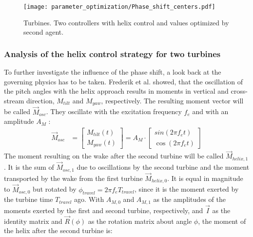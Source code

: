 \begin{figure}
	\centering
	\texttt{[image: parameter\_optimization/Phase\_shift\_centers.pdf]}
	\caption{ Turbines. Two controllers with helix control and values optimized by second agent.}
	\label{fig:phase_shift}
\end{figure}
\subsubsection{Analysis of the helix control strategy for two turbines}
To further investigate the influence of the phase shift, a look back at the governing physics has to be taken. Frederik et al. \cite{frederik_helix_2020} showed, that the oscillation of the pitch angles with the helix approach results in moments in vertical and cross-stream direction, $M_{tilt}$ and $M_{yaw}$, respectively. The resulting moment vector will be called $\vec{M}_{osc}$. They oscillate with the excitation frequency $f_e$ and with an amplitude $A_M$ :
\begin{align}
\vec{M}_{osc} &=
\begin{bmatrix}
M_{tilt}(t) \\
M_{yaw}(t)
\end{bmatrix} = 
A_M \cdot
\begin{bmatrix}
sin(2\pi f_e t) \\
\cos(2\pi f_e t)
\end{bmatrix}
\end{align}
The moment resulting on the wake after the second turbine will be called $\vec{M}_{helix,1}$. It is the sum of $\vec{M}_{osc,1}$ due to oscillations by the second turbine and the moment transported by the wake from the first turbine $\vec{M}_{helix,0}$. It is equal in magnitude to $\vec{M}_{osc,0}$ but rotated by $\phi_{travel}=2 \pi f_e T_{travel}$, since it is the moment exerted by the turbine time $T_{travel}$ ago. With $A_{M,0}$ and $A_{M,1}$ as the amplitudes of the moments exerted by the first and second turbine, respectively, and $\vec{I}$ as the identity matrix and $\vec{R}(\phi)$ as the rotation matrix about angle $\phi$, the moment of the helix after the second turbine is:
